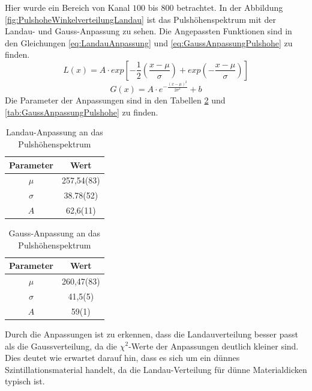 \documentclass{article}
\begin{document}
Hier wurde ein Bereich von Kanal $100$ bis $800$ betrachtet.
In der Abbildung \ref{fig:PulshoheWinkelverteilungLandau} ist das Pulshöhenspektrum mit der Landau- und Gauss-Anpassung zu sehen.
Die Angepassten Funktionen sind in den Gleichungen \ref{eq:LandauAnpassung} und \ref{eq:GaussAnpassungPulshohe} zu finden.
\begin{displaymath}
    L(x) = A \cdot exp\left[ -\frac{1}{2} \left( \frac{x - \mu}{\sigma} \right) + exp\left( -\frac{x - \mu }{\sigma} \right) \right] 
\label{eq:LandauAnpassung}
\end{displaymath}
\begin{displaymath}
    G(x) = A \cdot e^{-\frac{(x - \mu)^2}{2\sigma^2}} + b
\label{eq:GaussAnpassungPulshohe}
\end{displaymath}
Die Parameter der Anpassungen sind in den Tabellen \ref{tab:LandauAnpassungPulshohe} und \ref{tab:GaussAnpassungPulshohe} zu finden.
\begin{table}[H]
    \centering
    \caption{Landau-Anpassung an das Pulshöhenspektrum}
    \begin{tabular}{|c|c|}
        \hline
        Parameter & Wert \\ \hline \hline
        $\mu$ & 257,54(83) \\ \hline
        $\sigma$ & 38.78(52) \\ \hline
        $A$ & 62,6(11) \\ \hline
    \end{tabular}
    \label{tab:LandauAnpassungPulshohe}
\end{table}
\begin{table}[H]
    \centering
    \caption{Gauss-Anpassung an das Pulshöhenspektrum}
    \begin{tabular}{|c|c|}
        \hline
        Parameter & Wert \\ \hline \hline
        $\mu$ & 260,47(83) \\ \hline
        $\sigma$ & 41,5(5) \\ \hline
        $A$ & 59(1) \\ \hline
    \end{tabular}
    \label{tab:LandauAnpassungPulshohe}
\end{table}

Durch die Anpassungen ist zu erkennen, dass die Landauverteilung besser passt als die Gaussverteilung, da die $\chi^2$-Werte der Anpassungen deutlich kleiner sind.
Dies deutet wie erwartet darauf hin, dass es sich um ein dünnes Szintillationsmaterial handelt, da die Landau-Verteilung für dünne Materialdicken typisch ist.
\end{document}
